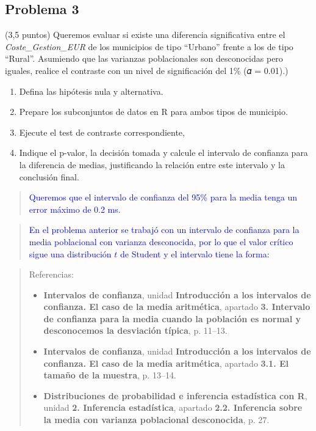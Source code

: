 \documentclass[
]{article}
\providecommand{\tightlist}{%
  \setlength{\itemsep}{0pt}\setlength{\parskip}{0pt}}
\begin{document}
\subsection{Problema 3}\label{problema-3}

(3,5 puntos) Queremos evaluar si existe una diferencia significativa
entre el \emph{Coste\_Gestion\_EUR} de los municipios de tipo ``Urbano''
frente a los de tipo ``Rural''. Asumiendo que las varianzas
poblacionales son desconocidas pero iguales, realice el contraste con un
nivel de significación del 1\% (𝛼 = 0.01).)

\begin{enumerate}
\def\labelenumi{\arabic{enumi}.}
\tightlist
\item
  Defina las hipótesis nula y alternativa.
\item
  Prepare los subconjuntos de datos en R para ambos tipos de municipio.
\item
  Ejecute el test de contraste correspondiente,
\item
  Indique el p-valor, la decisión tomada y calcule el intervalo de
  confianza para la diferencia de medias, justificando la relación entre
  este intervalo y la conclusión final.
\end{enumerate}

\begin{quote}
\textcolor{blue}{
Queremos que el intervalo de confianza del 95\% para la media tenga un error máximo de 0.2 ms.
}
\end{quote}

\begin{quote}
\textcolor{blue}{
En el problema anterior se trabajó con un intervalo de confianza para la media poblacional con varianza desconocida, por lo que el valor crítico sigue una distribución \(t\) de Student y el intervalo tiene la forma:
}
\end{quote}

\begin{quote}
Referencias:
\begin{itemize}
\item \textbf{Intervalos de confianza}, unidad \textbf{Introducción a los intervalos de confianza. El caso de la media aritmética}, apartado \textbf{3. Intervalo de confianza para la media cuando la población es normal y desconocemos la desviación típica}, p. 11--13.
\item \textbf{Intervalos de confianza}, unidad \textbf{Introducción a los intervalos de confianza. El caso de la media aritmética}, apartado \textbf{3.1. El tamaño de la muestra}, p. 13--14.
\item \textbf{Distribuciones de probabilidad e inferencia estadística con R}, unidad \textbf{2. Inferencia estadística}, apartado \textbf{2.2. Inferencia sobre la media con varianza poblacional desconocida}, p. 27.
\end{itemize}
\end{quote}
\end{document}
